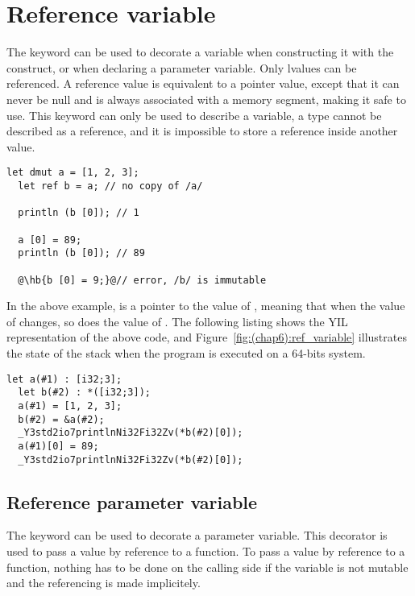 \section {Reference variable}
\label{sec:ref_variable}

The  keyword can be used to decorate a variable when constructing it
with the  construct, or when declaring a parameter variable. Only
lvalues can be referenced. A reference value is equivalent to a pointer value,
except that it can never be null and is always associated with a memory segment,
making it safe to use. This keyword can only be used to describe a variable, a
type cannot be described as a reference, and it is impossible to store a
reference inside another value.

\begin{lstlisting}[style=coloredverbatim, escapechar=@]
  let dmut a = [1, 2, 3];
  let ref b = a; // no copy of /a/

  println (b [0]); // 1

  a [0] = 89;
  println (b [0]); // 89

  @\hb{b [0] = 9;}@// error, /b/ is immutable
\end{lstlisting}

In the above example,  is a pointer to the value of ,
meaning that when the value of  changes, so does the value of
. The following listing shows the YIL representation of the above
code, and Figure~\ref{fig:(chap6):ref_variable} illustrates the state of the stack when the
program is executed on a 64-bits system.

\begin{lstlisting}[style=lyilVerb]
  let a(#1) : [i32;3];
  let b(#2) : *([i32;3]);
  a(#1) = [1, 2, 3];
  b(#2) = &a(#2);
  _Y3std2io7printlnNi32Fi32Zv(*b(#2)[0]);
  a(#1)[0] = 89;
  _Y3std2io7printlnNi32Fi32Zv(*b(#2)[0]);
\end{lstlisting}



\subsection{Reference parameter variable}
\label{sec:ref_param}

The  keyword can be used to decorate a parameter variable. This
decorator is used to pass a value by reference to a function. To pass a value by
reference to a function, nothing has to be done on the calling side if the
variable is not mutable and the referencing is made implicitely.

